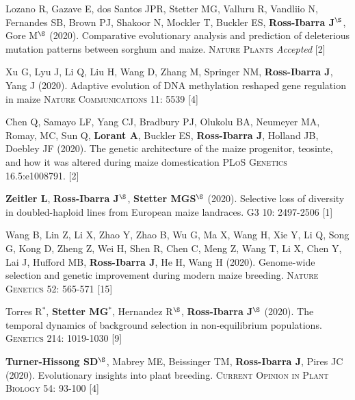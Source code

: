 \documentclass[letterpaper,10pt]{article}
\begin{document}
\begin{etaremune}
\setlength\itemsep{0ex}

\item Lozano R, Gazave E, dos Santos JPR, Stetter MG, Valluru R, Vandliio N, Fernandes SB, Brown PJ, Shakoor N, Mockler T, Buckler ES, \textbf{Ross-Ibarra J}$^\S$, Gore M$^\S$ (2020). Comparative evolutionary analysis and prediction of deleterious mutation patterns between sorghum and maize. \textsc{Nature Plants} \textit{Accepted} %
 [2]\\

\item Xu G, Lyu J, Li Q, Liu H, Wang D, Zhang M, Springer NM, \textbf{Ross-Ibarra J}, Yang J (2020). Adaptive evolution of DNA methylation reshaped gene regulation in maize \textsc{Nature Communications} 11: 5539
 [4]\\

\item Chen Q, Samayo LF, Yang CJ, Bradbury PJ, Olukolu BA, Neumeyer MA, Romay, MC, Sun Q, \textbf{Lorant A}, Buckler ES, \textbf{Ross-Ibarra J}, Holland JB, Doebley JF (2020).
The genetic architecture of the maize progenitor, teosinte, and how it was altered during maize domestication \textsc{PLoS Genetics} 16.5:e1008791.
 [2]\\

\item \textbf{Zeitler L}, \textbf{Ross-Ibarra J}$^\S$, \textbf{Stetter MGS}$^\S$ (2020). Selective loss of diversity in doubled-haploid lines from European maize landraces. \textsc{G3} 10: 2497-2506
 [1]\\

\item Wang B, Lin Z, Li X, Zhao Y, Zhao B, Wu G, Ma X, Wang H, Xie Y, Li Q, Song G, Kong D, Zheng Z, Wei H, Shen R, Chen C, Meng Z, Wang T, Li X, Chen Y, Lai J, Hufford MB, \textbf{Ross-Ibarra J}, He H, Wang H (2020). Genome-wide selection and genetic improvement during modern maize breeding. \textsc{Nature  Genetics} 52: 565-571
 [15]\\

\item Torres R$^*$, \textbf{Stetter MG}$^*$, Hernandez R$^\S$, \textbf{Ross-Ibarra J}$^\S$ (2020). The temporal dynamics of background selection in non-equilibrium populations. \textsc{Genetics} 214: 1019-1030
 [9]\\

\item \textbf{Turner-Hissong SD}$^\S$, Mabrey ME, Beissinger TM, \textbf{Ross-Ibarra J}, Pires JC (2020). Evolutionary insights into plant breeding. \textsc{Current Opinion in Plant Biology} 54: 93-100
 [4]\\


\end{etaremune}
\end{document}
